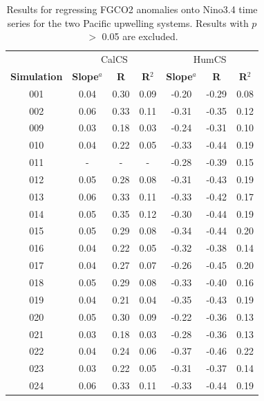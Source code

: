 \documentclass[12pt]{article}
\begin{document}
\newpage
\begin{table}[!h]
	\centering
	\caption{Results for regressing FGCO2 anomalies onto Nino3.4 time series for the two Pacific upwelling systems. Results with $p$ $>$ 0.05 are excluded.}
\begin{tabular}{c c c c | c c c}
	& \multicolumn{3}{c}{CalCS} & \multicolumn{3}{c}{HumCS} \\
	\cmidrule{2-4}\cmidrule{5-7}
	\textbf{Simulation} &  \textbf{Slope}$^{a}$  &  \textbf{R} &  \textbf{R$^{2}$} &  \textbf{Slope}$^{a}$  &  \textbf{R} &  \textbf{R$^{2}$}  \\
	\midrule
	001 &   0.04 &     0.30 &       0.09 &  -0.20 &    -0.29 &       0.08 \\
	002 &   0.06 &     0.33 &       0.11 &  -0.31 &    -0.35 &       0.12 \\
	009 &   0.03 &     0.18 &       0.03 &  -0.24 &    -0.31 &       0.10 \\
	010 &   0.04 &     0.22 &       0.05 &  -0.33 &    -0.44 &       0.19 \\
	011 &    - &      - &                    -  &  -0.28 &    -0.39 &       0.15 \\
	012 &   0.05 &     0.28 &       0.08 &  -0.31 &    -0.43 &       0.19 \\
	013 &   0.06 &     0.33 &       0.11 &  -0.33 &    -0.42 &       0.17 \\
	014 &   0.05 &     0.35 &       0.12 &  -0.30 &    -0.44 &       0.19 \\
	015 &   0.05 &     0.29 &       0.08 &  -0.34 &    -0.44 &       0.20 \\
	016 &   0.04 &     0.22 &       0.05 &  -0.32 &    -0.38 &       0.14 \\
	017 &   0.04 &     0.27 &       0.07 &  -0.26 &    -0.45 &       0.20 \\
	018 &   0.05 &     0.29 &       0.08 &  -0.33 &    -0.40 &       0.16 \\
	019 &   0.04 &     0.21 &       0.04 &  -0.35 &    -0.43 &       0.19 \\
	020 &   0.05 &     0.30 &       0.09 &  -0.22 &    -0.36 &       0.13 \\
	021 &   0.03 &     0.18 &       0.03 &  -0.28 &    -0.36 &       0.13 \\
	022 &   0.04 &     0.24 &       0.06 &  -0.37 &    -0.46 &       0.22 \\
	023 &   0.03 &     0.22 &       0.05 &  -0.31 &    -0.37 &       0.14 \\
	024 &   0.06 &     0.33 &       0.11 &  -0.33 &    -0.44 &       0.19 \\

\end{tabular}
\end{table}
\end{document}
